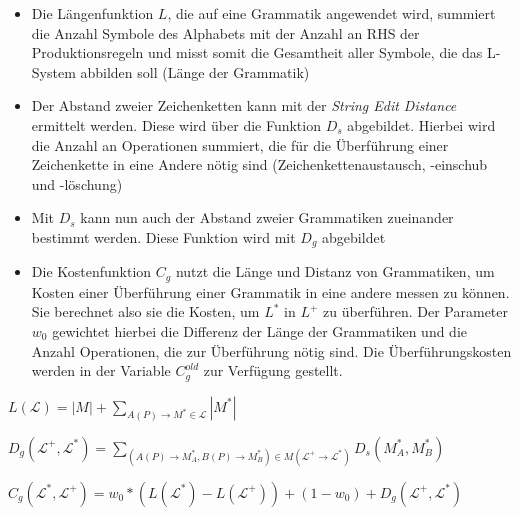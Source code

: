 \begin{itemize}
    \item Die Längenfunktion $L$, die auf eine Grammatik angewendet wird, summiert die Anzahl Symbole des Alphabets mit
    der Anzahl an RHS der Produktionsregeln und misst somit die Gesamtheit aller Symbole, die das L-System abbilden soll
    (Länge der Grammatik)
    \item Der Abstand zweier Zeichenketten kann mit der \textit{String Edit Distance} ermittelt werden. Diese wird über
    die Funktion $D_s$ abgebildet. Hierbei wird die Anzahl an Operationen summiert, die für die Überführung einer Zeichenkette
    in eine Andere nötig sind (Zeichenkettenaustausch, -einschub und -löschung)
    \item Mit $D_s$ kann nun auch der Abstand zweier Grammatiken zueinander bestimmt werden. Diese Funktion wird mit
    $D_g$ abgebildet
    \item Die Kostenfunktion $C_g$ nutzt die Länge und Distanz von Grammatiken, um Kosten einer Überführung einer Grammatik
    in eine andere messen zu können. Sie berechnet also sie die Kosten, um $L^*$ in $L^+$ zu überführen.
    Der Parameter $w_0$ gewichtet hierbei die Differenz der Länge der Grammatiken und die Anzahl Operationen, die zur
    Überführung nötig sind. Die Überführungskosten werden in der Variable $C^{old}_g$ zur Verfügung gestellt.
\end{itemize}

\begin{algorithm}[caption={Längenfunktion $L$ für Grammatiken}]
$L(\mathcal{L}) = |M| + \sum\limits_{A(P) \rightarrow M^* \in \mathcal{L}} |M^*|$
\end{algorithm}

\begin{algorithm}[caption={Grammar Edit Distance}]
    $D_g(\mathcal{L}^+, \mathcal{L}^*)= \sum\limits_{(A(P) \rightarrow M^*_A , B(P) \rightarrow M^*_B) \in M(\mathcal{L^+} \rightarrow \mathcal{L^*})} D_s(M^*_A, M^*_B)$
\end{algorithm}

\begin{algorithm}[caption={Kostenfunktion $C_g$ mit Gewichtung $w_0$}]
$C_g(\mathcal{L}^*, \mathcal{L}^+) = w_0 * (L(\mathcal{L}^*) - L(\mathcal{L}^+)) + (1 - w_0) + D_g(\mathcal{L}^+, \mathcal{L}^*)$
\end{algorithm}

